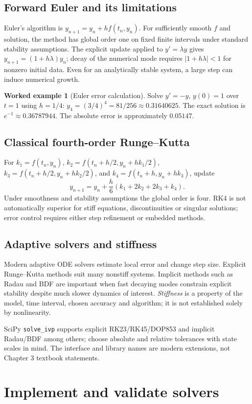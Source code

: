 \documentclass[11pt,letterpaper,oneside]{report}
\theoremstyle{definition}\newtheorem{definition}[theorem]{Definition}
\newtheorem{example}[theorem]{Worked example}
\theoremstyle{remark}\newtheorem{remark}[theorem]{Remark}
\begin{document}
\section{Forward Euler and its limitations}
Euler's algorithm is $y_{n+1}=y_n+h f(t_n,y_n)$. For sufficiently smooth $f$ and solution, the method has global order one on fixed finite intervals under standard stability assumptions. The explicit update applied to $y'=\lambda y$ gives $y_{n+1}=(1+h\lambda)y_n$; decay of the numerical mode requires $|1+h\lambda|<1$ for nonzero initial data. Even for an analytically stable system, a large step can induce numerical growth.
\begin{example}[Euler error calculation]
Solve $y'=-y$, $y(0)=1$ over $t=1$ using $h=1/4$: $y_4=(3/4)^4=81/256\approx0.31640625$. The exact solution is $e^{-1}\approx0.36787944$. The absolute error is approximately $0.05147$.
\end{example}
\section{Classical fourth-order Runge--Kutta}
For $k_1=f(t_n,y_n)$, $k_2=f(t_n+h/2,y_n+hk_1/2)$, $k_3=f(t_n+h/2,y_n+hk_2/2)$, and $k_4=f(t_n+h,y_n+hk_3)$, update
\[y_{n+1}=y_n+\frac h6(k_1+2k_2+2k_3+k_4).\]
Under smoothness and stability assumptions the global order is four. RK4 is not automatically superior for stiff equations, discontinuities or singular solutions; error control requires either step refinement or embedded methods.
\section{Adaptive solvers and stiffness}
Modern adaptive ODE solvers estimate local error and change step size. Explicit Runge--Kutta methods suit many nonstiff systems. Implicit methods such as Radau and BDF are important when fast decaying modes constrain explicit stability despite much slower dynamics of interest. \emph{Stiffness} is a property of the model, time interval, chosen accuracy and algorithm; it is not established solely by nonlinearity.
\begin{modern}SciPy \texttt{solve\_ivp} supports explicit RK23/RK45/DOP853 and implicit Radau/BDF among others; choose absolute and relative tolerances with state scales in mind. The interface and library names are modern extensions, not Chapter 3 textbook statements.\end{modern}
\chapter{Implement and validate solvers}
\end{document}
